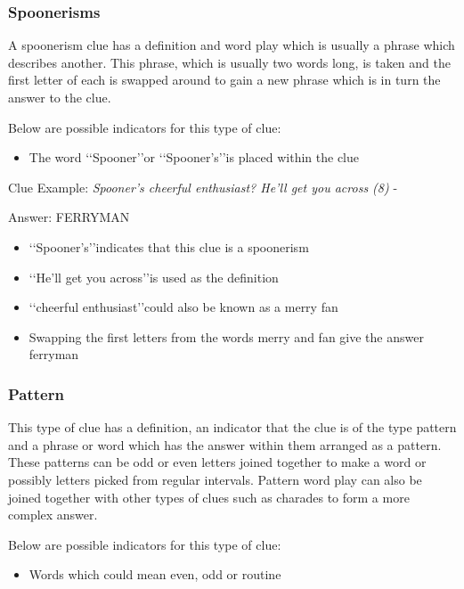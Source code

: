 \subsubsection{Spoonerisms}

A spoonerism clue has a definition and word play which is usually a phrase which describes another. This phrase, which is usually two words long, is taken and the first letter of each is swapped around to gain a new phrase which is in turn the answer to the clue.  

Below are possible indicators for this type of clue:
\begin{itemize} 
	\item The word \lq\lq Spooner\rq\rq or \lq\lq Spooner’s\rq\rq is placed within the clue
\\ 
\end{itemize}

Clue Example: \emph{Spooner's cheerful enthusiast? He'll get you across (8)} - \citep{connorSpoon12}

Answer: FERRYMAN 

\begin{itemize}
	\item \lq\lq Spooner’s\rq\rq indicates that this clue is a spoonerism 
	\item \lq\lq He’ll get you across\rq\rq is used as the definition 
	\item \lq\lq cheerful enthusiast\rq\rq could also be known as a merry fan 
	\item Swapping the first letters from the words merry and fan give the answer ferryman 
\end{itemize}

\subsubsection{Pattern}

This type of clue has a definition, an indicator that the clue is of the type pattern and a phrase or word which has the answer within them arranged as a pattern. These patterns can be odd or even letters joined together to make a word or possibly letters picked from regular intervals. Pattern word play can also be joined together with other types of clues such as charades to form a more complex answer. 

Below are possible indicators for this type of clue:
\begin{itemize} 
	\item Words which could mean even, odd or routine 
\\
\end{itemize}


